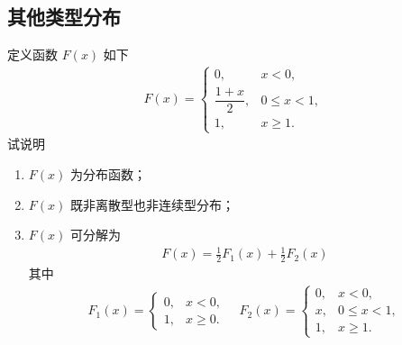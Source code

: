 \subsection{其他类型分布}
\begin{frame}
	\begin{exam}
		定义函数 $F (x)$ 如下
		\begin{eqnarray*}
			F(x)=\left\{
			\begin{array}{ll}
				0,              & x< 0,      \\
				\dfrac{1+x}{2}, & 0\le x< 1, \\
				1,              & x\ge 1.
			\end{array}
			\right.
		\end{eqnarray*}
		试说明  \begin{enumerate}
			\item $F (x)$ 为分布函数；
			\item $F (x)$ 既非离散型也非连续型分布；
			\item $F (x)$ 可分解为
			      \begin{eqnarray*}
				      F(x)=\frac{1}{2}F_1(x)+\frac{1}{2}F_2(x)
			      \end{eqnarray*}
			      \pause  其中 \begin{eqnarray*}
				      F_1(x)=\left\{
				      \begin{array}{ll}
					      0, & x< 0,    \\
					      1, & x\ge 0.
				      \end{array}
				      \right.
				      \quad  F_2(x)=\left\{\begin{array}{ll}
					      0, & x<0,       \\
					      x, & 0\le x< 1, \\
					      1, & x\ge 1.
				      \end{array}
				      \right.
			      \end{eqnarray*}
		\end{enumerate}

	\end{exam}
\end{frame}


